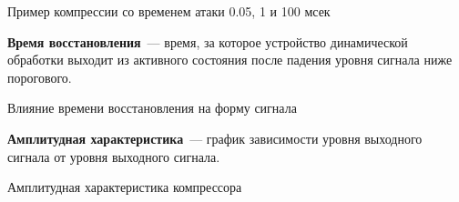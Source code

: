 \documentclass{beamer}
\begin{document}
\begin{frame}
  \begin{block}{Пример компрессии со временем атаки 0.05, 1 и 100 мсек}
  \end{block}
\end{frame}

\begin{frame}
  \textbf{Время восстановления}~--- время, за которое устройство динамической обработки выходит из активного состояния после падения уровня сигнала ниже порогового.

  \begin{block}{Влияние времени восстановления на форму сигнала}
  \end{block}
\end{frame}

\begin{frame}
  \textbf{Амплитудная характеристика}~--- график зависимости уровня выходного сигнала от уровня выходного сигнала.

  \begin{block}{Амплитудная характеристика компрессора}
  \end{block}
\end{frame}
\end{document}
